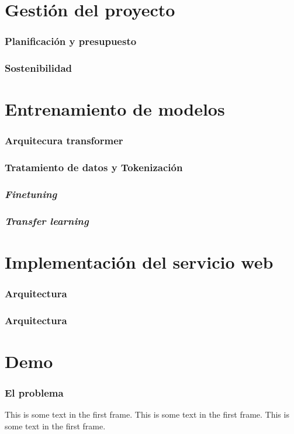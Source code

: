 \documentclass{beamer}
\begin{document}
\section{Gestión del proyecto}
\begin{frame}
    \frametitle{Planificación y presupuesto}
\end{frame}

\begin{frame}
    \frametitle{Sostenibilidad}
\end{frame}








\section{Entrenamiento de modelos}
\begin{frame}
    \frametitle{Arquitecura transformer}
\end{frame}

\begin{frame}
    \frametitle{Tratamiento de datos y Tokenización}
\end{frame}

\begin{frame}
    \frametitle{\textit{Finetuning}}
\end{frame}

\begin{frame}
    \frametitle{\textit{Transfer learning}}
\end{frame}








\section{Implementación del servicio web}
\begin{frame}
\frametitle{Arquitectura}
\end{frame}

\begin{frame}
    \frametitle{Arquitectura}
\end{frame}








\section{Demo}
\begin{frame}
    \frametitle{El problema}
    This is some text in the first frame. This is some text in the first frame. This is some text in the first frame.
\end{frame}
\end{document}
